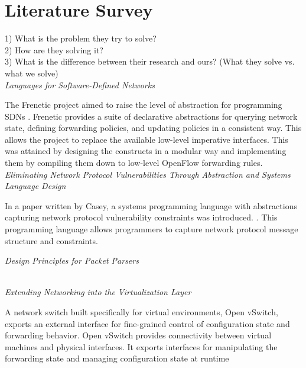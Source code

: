 
\section{Literature Survey}
1) What is the problem they try to solve? \\
2) How are they solving it? \\
3) What is the difference between their research and ours?  (What they solve vs. what we solve) \\


\noindent \emph{Languages for Software-Defined Networks}

The Frenetic project aimed to raise the level of abstraction for 
programming SDNs \cite{Foster2013}. Frenetic provides a suite of declarative abstractions 
for querying network state, defining forwarding policies, and updating 
policies in a consistent way. This allows the project to replace the 
available low-level imperative interfaces. This was attained by designing 
the constructs in a modular way and implementing them by compiling
them down to low-level OpenFlow forwarding rules. \\

\noindent \emph{Eliminating Network Protocol Vulnerabilities Through Abstraction and Systems Language Design}

In a paper written by Casey, a systems programming language with abstractions capturing network
protocol vulnerability constraints was introduced. \cite{Casey2013}. This programming language
allows programmers to capture network protocol message structure and constraints. 


\noindent \emph{Design Principles for Packet Parsers}


\cite{Gibb2013} \\

\noindent \emph{Extending Networking into the Virtualization Layer}

A network switch built specifically for virtual environments, Open vSwitch, exports an external interface
for fine-grained control of configuration state and forwarding behavior. Open vSwitch provides
connectivity between virtual machines and physical interfaces. It exports interfaces for manipulating
the forwarding state and managing configuration state at runtime  
\cite{Pfaff2009} \\

